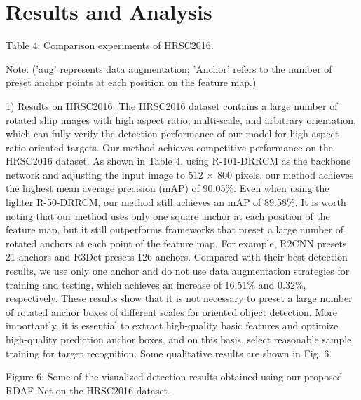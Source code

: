 \documentclass[journal]{IEEEtran}
\begin{document}
\section{ Results and Analysis }

Table 4: Comparison experiments of HRSC2016.

Note: ('aug' represents data augmentation; 'Anchor' refers to the number of preset anchor points at each position on the feature map.)

1) Results on HRSC2016: The HRSC2016 dataset contains a large number of rotated ship images with high aspect ratio, multi-scale, and arbitrary orientation, which can fully verify the detection performance of our model for high aspect ratio-oriented targets. Our method achieves competitive performance on the HRSC2016 dataset. As shown in Table 4, using R-101-DRRCM as the backbone network and adjusting the input image to 512 × 800 pixels, our method achieves the highest mean average precision (mAP) of 90.05\%. Even when using the lighter R-50-DRRCM, our method still achieves an mAP of 89.58\%. It is worth noting that our method uses only one square anchor at each position of the feature map, but it still outperforms frameworks that preset a large number of rotated anchors at each point of the feature map. For example, R2CNN presets 21 anchors and R3Det presets 126 anchors. Compared with their best detection results, we use only one anchor and do not use data augmentation strategies for training and testing, which achieves an increase of 16.51\% and 0.32\%, respectively. These results show that it is not necessary to preset a large number of rotated anchor boxes of different scales for oriented object detection. More importantly, it is essential to extract high-quality basic features and optimize high-quality prediction anchor boxes, and on this basis, select reasonable sample training for target recognition. Some qualitative results are shown in Fig. 6.

Figure 6: Some of the visualized detection results obtained using our proposed RDAF-Net on the HRSC2016 dataset.
\end{document}
